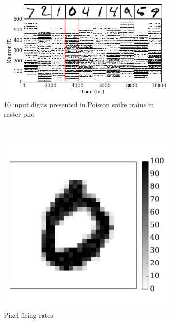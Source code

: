 \documentclass[runningheads,a4paper]{llncs}
\begin{document}
\begin{figure}[tbh!]
	\centering
	\begin{subfigure}[t]{0.8\textwidth}
		\includegraphics[width=\textwidth]{6-1.png}
		\caption{10 input digits presented in Poisson spike trains in raster plot}
		\label{Fig:61}
	\end{subfigure}\\
	\begin{subfigure}[t]{0.3\textwidth}
		\includegraphics[width=\textwidth]{6-2.pdf}
		\caption{Pixel firing rates}
		\label{Fig:62}
	\end{subfigure}
	\begin{subfigure}[t]{0.3\textwidth}

\end{subfigure}
\end{figure}
\end{document}
